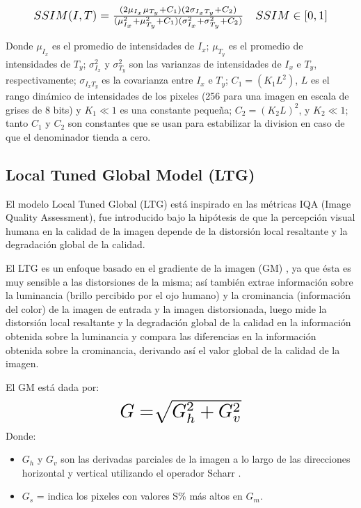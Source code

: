 \documentclass[spanish,twocolumn]{article}
\begin{document}
\begin{equation}\label{eq:ssim}
\resizebox{.9\hsize}{!}
{
$SSIM(I,T)=\frac{(2\mu_{I_x}\mu_{T_y}+C_1)(2\sigma_{I_xT_y}+C_2)}{(\mu_{I_x}^2+\mu_{T_y}^2+C_1)(\sigma_{I_x}^2+\sigma_{T_y}^2+C_2)} \quad SSIM \in [0,1]$
}
\end{equation}

Donde $\mu_{I_x}$ es el promedio de intensidades de $I_x$; $\mu_{T_y}$ es el promedio de intensidades de $T_y$; $\sigma_{I_x}^2$ y $\sigma_{T_y}^2$ son las varianzas de intensidades de $I_x$ e $T_y$, respectivamente; $\sigma_{I_x T_y}$ es la covarianza entre $I_x$ e $T_y$; $C_1=(K_1L^2)$, $L$ es el rango dinámico de intensidades de los pixeles (256 para una imagen en escala de grises de 8 bits) y $K_1 \ll 1$ es una constante pequeña; $C_2=(K_2 L)^2$, y $K_2 \ll 1$; tanto $C_1$ y $C_2$ son constantes que se usan para estabilizar la division en caso de que el denominador tienda a cero.

\subsection{ Local Tuned Global Model (LTG)}
\label{ssec:ltg}
El modelo {Local Tuned Global (LTG)} está inspirado en las métricas IQA (Image Quality Assessment)\cite{ltg2014}, fue introducido bajo la hipótesis de que la percepción visual humana en  la calidad de la imagen depende de la distorsión local resaltante y la degradación global de la calidad. 

El LTG es un enfoque basado en el gradiente de la imagen (GM) \cite{gradiente}, ya que ésta es muy sensible a las distorsiones de la misma; así también extrae información sobre la luminancia (brillo percibido por el ojo humano) y la crominancia (información del color) de la imagen de entrada y la imagen distorsionada, luego mide la distorsión local resaltante y la degradación global de la calidad en la información obtenida sobre la luminancia y compara las diferencias en la información obtenida sobre la crominancia, derivando así el valor global de la calidad de la imagen.

El GM está dada por:
\begin{equation}\label{eq:gm}
\resizebox{.4\hsize}{!}
{
$G = \sqrt[]{G_{h}^{2} + G_{v}^{2}}$
}
\end{equation}
Donde:
\begin{itemize}
 \item $G_{h}$ y  $G_{v}$ son las derivadas parciales de la imagen a lo largo de las direcciones horizontal y vertical utilizando el operador Scharr \cite{jahne1999handbook}.
 \item $ G_{s}$ = indica los pixeles con valores S\% más altos en $G_{m}$.
\end{itemize} 
 
\end{document}
